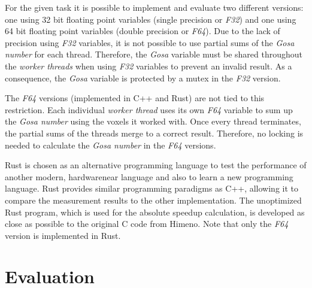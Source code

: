 For the given task it is possible to implement and evaluate two different versions: one using 32 bit floating point variables (single precision or \textit{F32}) and one using 64 bit floating point variables (double precision or \textit{F64}). Due to the lack of precision using \textit{F32} variables, it is not possible to use partial sums of the \textit{Gosa number} for each thread. Therefore, the \textit{Gosa} variable must be shared throughout the \textit{worker threads} when using \textit{F32} variables to prevent an invalid result. As a consequence, the \textit{Gosa} variable is protected by a mutex in the \textit{F32} version.

The \textit{F64} versions (implemented in C++ and Rust) are not tied to this restriction. Each individual \textit{worker thread} uses its own \textit{F64} variable to sum up the \textit{Gosa number} using the voxels it worked with. Once every thread terminates, the partial sums of the threads merge to a correct result. Therefore, no locking is needed to calculate the \textit{Gosa number} in the \textit{F64} versions.

Rust is chosen as an alternative programming language to test the performance of another modern, hardwarenear language and also to learn a new programming language. Rust provides similar programming paradigms as C++, allowing it to compare the measurement results to the other implementation. The unoptimized Rust program, which is used for the absolute speedup calculation, is developed as close as possible to the original C code from Himeno. Note that only the \textit{F64} version is implemented in Rust.

\section{Evaluation}
\label{sec:evaluation}

